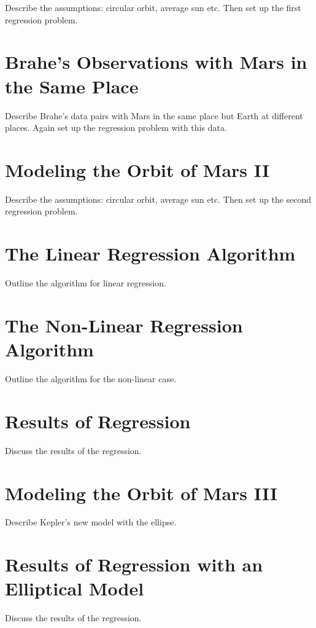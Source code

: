 Describe the assumptions: circular orbit, average sun etc. Then set up the first regression problem.

\section*{Brahe's Observations with Mars in the Same Place}

Describe Brahe's data pairs with Mars in the same place but Earth at different places. 
Again set up the regression problem with this data.

\section*{Modeling the Orbit of Mars II}

Describe the assumptions: circular orbit, average sun etc. Then set up the second regression problem.

\section*{The Linear Regression Algorithm}

Outline the algorithm for linear regression.

\section*{The Non-Linear Regression Algorithm}

Outline the algorithm for the non-linear case.

\section*{Results of Regression}

Discuss the results of the regression.

\section*{Modeling the Orbit of Mars III}

Describe Kepler's new model with the ellipse.

\section*{Results of Regression with an Elliptical Model}

Discuss the results of the regression.

